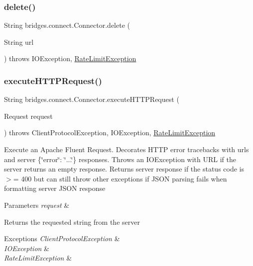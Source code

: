 \subsubsection{\texorpdfstring{delete()}{delete()}}
{\footnotesize\ttfamily String bridges.\+connect.\+Connector.\+delete (\begin{DoxyParamCaption}\item[{String}]{url }\end{DoxyParamCaption}) throws I\+O\+Exception, \mbox{\hyperlink{classbridges_1_1validation_1_1_rate_limit_exception}{Rate\+Limit\+Exception}}}

\mbox{\label{classbridges_1_1connect_1_1_connector_aabcfde23d155c8c42edb8a1407320bc5}} 
\subsubsection{\texorpdfstring{executeHTTPRequest()}{executeHTTPRequest()}}
{\footnotesize\ttfamily String bridges.\+connect.\+Connector.\+execute\+H\+T\+T\+P\+Request (\begin{DoxyParamCaption}\item[{Request}]{request }\end{DoxyParamCaption}) throws Client\+Protocol\+Exception, I\+O\+Exception, \mbox{\hyperlink{classbridges_1_1validation_1_1_rate_limit_exception}{Rate\+Limit\+Exception}}}

Execute an Apache Fluent Request. Decorates H\+T\+TP error tracebacks with urls and server \{\char`\"{}error\char`\"{}\+: \char`\"{}...\char`\"{}\} responses. Throws an I\+O\+Exception with U\+RL if the server returns an empty response. Returns server response if the status code is $>$= 400 but can still throw other exceptions if J\+S\+ON parsing fails when formatting server J\+S\+ON response 
\begin{DoxyParams}{Parameters}
{\em request} & \\
\hline
\end{DoxyParams}
\begin{DoxyReturn}{Returns}
the requested string from the server 
\end{DoxyReturn}

\begin{DoxyExceptions}{Exceptions}
{\em Client\+Protocol\+Exception} & \\
\hline
{\em I\+O\+Exception} & \\
\hline
{\em Rate\+Limit\+Exception} & \\
\hline
\end{DoxyExceptions}
\mbox{\label{classbridges_1_1connect_1_1_connector_aec8d54bf707c50d6f8173a0c1640fcd5}} 
